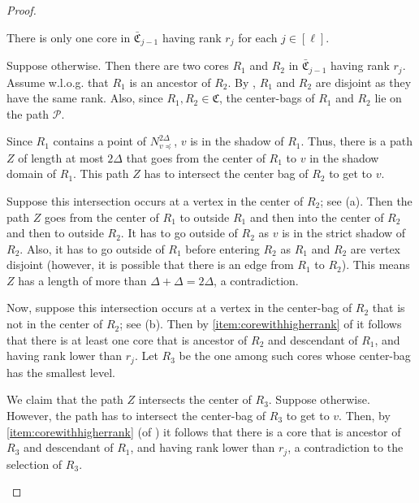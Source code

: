 \documentclass{article}
\newcommand{\mP}{\mathcal{P}}
\def\core{R}
\def\C{\mathfrak{C}}
\def\barC{\bar{\C}}
\begin{document}
\begin{proof}
	\begin{claim}\label{lem:oner_j}
		There is only one core in $\barC_{j-1}$ having rank $r_j$ for each $j\in [\ell]$.
	\end{claim}
	\begin{subproof}
		Suppose otherwise. Then there are two cores $\core_1$ and $\core_2$ in $\barC_{j-1}$ having rank $r_j$. Assume w.l.o.g. that $\core_1$ is an ancestor of $\core_2$.  By ,  $\core_1$ and $\core_2$ are disjoint as they have the same rank. Also, since $\core_1,\core_2\in \C$, the center-bags of $\core_1$ and $\core_2$ lie on the path $\mP$.
		
		Since  $\core_1$ contains a point of  $N_{v\preceq}^{2\Delta}$, $v$ is in the shadow of $\core_1$. Thus, there is a path $Z$ of length at most $2 \Delta$  that goes from the center of $\core_1$ to $v$ in the shadow domain of $\core_1$. This path $Z$ has to intersect the center bag of $\core_2$ to get to $v$.
		

		Suppose this intersection occurs at a vertex in the center of $\core_2$; see (a). Then the path $Z$ goes from the center of $\core_1$ to outside $\core_1$ and then into the center of $\core_2$ and then to outside $\core_2$. It has to go outside of $\core_2$ as $v$ is in the strict shadow of $\core_2$.
		Also, it has to go outside of $\core_1$ before entering $\core_2$ as $\core_1$ and $\core_2$ are vertex disjoint (however, it is possible that there is an edge from $\core_1$ to $\core_2$).
		This means $Z$ has a length of more than $\Delta+\Delta=2\Delta$, a contradiction.
		
		Now, suppose this intersection occurs at a vertex in the center-bag of $\core_2$ that is not in the center of $\core_2$; see (b).
		Then by \cref{item:corewithhigherrank} of  it follows that there is at least one core that is ancestor of $\core_2$ and descendant of $\core_1$, and having rank lower than $r_j$. Let $\core_3$ be the one among such cores whose center-bag has the smallest level. 
		
		We claim that the path $Z$ intersects the center of $\core_3$. Suppose otherwise. However, the path has to intersect the center-bag of $\core_3$ to get to $v$.
		Then, by \cref{item:corewithhigherrank} (of ) it follows that there is a core that is ancestor of $\core_3$ and descendant of $\core_1$, and having rank lower than $r_j$, a contradiction to the selection of $\core_3$.
		

\end{subproof}
\end{proof}
\end{document}
